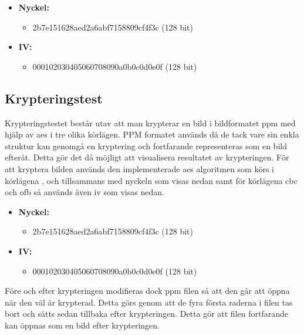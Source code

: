 \begin{itemize}
    \item []\textbf{Nyckel:}
    \begin{itemize}
        \item 2b7e151628aed2a6abf7158809cf4f3c (128 bit)
    \end{itemize}
    \item []\textbf{IV:}
    \begin{itemize}
        \item 000102030405060708090a0b0c0d0e0f (128 bit)
    \end{itemize}
\end{itemize}

\subsection{Krypteringstest} %
\label{sec:krypterings-test}
Krypteringstestet består utav att man krypterar en bild i bildformatet \gls{ppm} med hjälp av \acrshort{aes} i tre olika körlägen.
PPM formatet används då de tack vare sin enkla struktur kan genomgå en kryptering och fortfarande representeras som en bild
efteråt. Detta gör det då möjligt att visualisera resultatet av krypteringen. För att kryptera bilden används den implementerade
\acrshort{aes} algoritmen som körs i körlägena ,  och  tillsammans med nyckeln som visas nedan samt
för körlägena \acrshort{cbc} och \acrshort{ofb} så används även \acrshort{iv} som visas nedan.

\begin{itemize}
    \item []\textbf{Nyckel:}
    \begin{itemize}
        \item 2b7e151628aed2a6abf7158809cf4f3c (128 bit)
    \end{itemize}
    \item []\textbf{IV:}
    \begin{itemize}
        \item 000102030405060708090a0b0c0d0e0f (128 bit)
    \end{itemize}
\end{itemize}

Före och efter krypteringen modifieras dock \gls{ppm} filen så att den går att öppna när den väl är krypterad. Detta görs genom att de fyra
första raderna i filen tas bort och sätts sedan tillbaka efter krypteringen. Detta gör att filen fortfarande kan öppnas som en bild
efter krypteringen.

